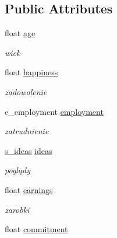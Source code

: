 \subsection*{Public Attributes}
\begin{DoxyCompactItemize}
\item 
\hypertarget{classCitizen_af59a2f517291f28c0f86c569770d2ed8}{float \hyperlink{classCitizen_af59a2f517291f28c0f86c569770d2ed8}{age}}\label{classCitizen_af59a2f517291f28c0f86c569770d2ed8}

\begin{DoxyCompactList}\small\item\em wiek \end{DoxyCompactList}\item 
\hypertarget{classCitizen_a8cb2492be0ca7360d72d76948853ed60}{float \hyperlink{classCitizen_a8cb2492be0ca7360d72d76948853ed60}{happiness}}\label{classCitizen_a8cb2492be0ca7360d72d76948853ed60}

\begin{DoxyCompactList}\small\item\em zadowolenie \end{DoxyCompactList}\item 
\hypertarget{classCitizen_a6eede2e2638a5e0e4b6a071492d59023}{e\+\_\+employment \hyperlink{classCitizen_a6eede2e2638a5e0e4b6a071492d59023}{employment}}\label{classCitizen_a6eede2e2638a5e0e4b6a071492d59023}

\begin{DoxyCompactList}\small\item\em zatrudnienie \end{DoxyCompactList}\item 
\hypertarget{classCitizen_ac0727fb6ab762125958c81d1fb615671}{\hyperlink{structs__ideas}{s\+\_\+ideas} \hyperlink{classCitizen_ac0727fb6ab762125958c81d1fb615671}{ideas}}\label{classCitizen_ac0727fb6ab762125958c81d1fb615671}

\begin{DoxyCompactList}\small\item\em poglądy \end{DoxyCompactList}\item 
\hypertarget{classCitizen_a7df6a9a2dd69a92a92de16eaa5e933e9}{float \hyperlink{classCitizen_a7df6a9a2dd69a92a92de16eaa5e933e9}{earnings}}\label{classCitizen_a7df6a9a2dd69a92a92de16eaa5e933e9}

\begin{DoxyCompactList}\small\item\em zarobki \end{DoxyCompactList}\item 
\hypertarget{classCitizen_a0ff5d3a1b560a6564b782f93b16ed24a}{float \hyperlink{classCitizen_a0ff5d3a1b560a6564b782f93b16ed24a}{commitment}}\label{classCitizen_a0ff5d3a1b560a6564b782f93b16ed24a}


\end{DoxyCompactItemize}
